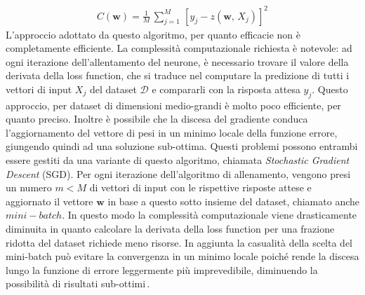 % 
\begin{gather*}
    C(\mathbf{w}) = \frac{1}{M}\,\sum_{j = 1}^M\,{\left[ y_j - z(\mathbf{w},\,X_j) \right]}^2
\end{gather*}
% 
\noindent L'approccio adottato da questo algoritmo, per quanto efficacie non è completamente efficiente. La complessità computazionale richiesta è notevole: ad ogni iterazione dell'allentamento del neurone, è necessario trovare il valore della derivata della loss function, che si traduce nel computare la predizione di tutti i vettori di input $X_j$ del dataset $\mathcal{D}$ e compararli con la risposta attesa $y_j$. Questo approccio, per dataset di dimensioni medio-grandi è molto poco efficiente, per quanto preciso. Inoltre è possibile che la discesa del gradiente conduca l'aggiornamento del vettore di pesi in un minimo locale della funzione errore, giungendo quindi ad una soluzione sub-ottima. Questi problemi possono entrambi essere gestiti da una variante di questo algoritmo, chiamata \textit{Stochastic Gradient Descent} (\acs{SGD}). Per ogni iterazione dell'algoritmo di allenamento, vengono presi un numero $m < M$ di vettori di input con le rispettive risposte attese e aggiornato il vettore $\mathbf{w}$ in base a questo sotto insieme del dataset, chiamato anche $mini-batch$. In questo modo la complessità computazionale viene drasticamente diminuita in quanto calcolare la derivata della loss function per una frazione ridotta del dataset richiede meno risorse. In aggiunta la casualità della scelta del mini-batch può evitare la convergenza in un minimo locale poiché rende la discesa lungo la funzione di errore leggermente più imprevedibile, diminuendo la possibilità di risultati sub-ottimi\,\cite{lu2022gradient, andrychowicz2016learning, nielsen2015neural}.

